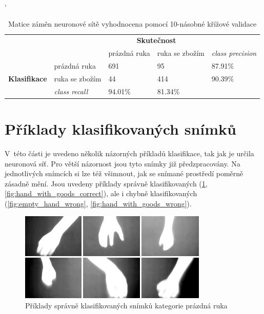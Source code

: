 \begin{table}[]
  \catcode`
  \centering
  \begin{tabular}{cl|l|l|l}
    \cline{3-4}
    \multicolumn{1}{l}{} & \multicolumn{1}{c|}{} & \multicolumn{2}{c|}{\cellcolor{Blue}\color{White}\textbf{Skutečnost}} &  \\ \cline{3-5} 
     & \multicolumn{1}{c|}{} & prázdná ruka & ruka se zbožím & \multicolumn{1}{l|}{\textit{class precision}} \\ \hline
    \multicolumn{1}{|c|}{\cellcolor{Blue}} & prázdná ruka & 691 & 95 & \multicolumn{1}{l|}{87.91\%} \\ \cline{2-5} 
    \multicolumn{1}{|c|}{\multirow{-2}{*}{\cellcolor{Blue}\color{White}\textbf{Klasifikace}}} & ruka se zbožím & 44 & 414 & \multicolumn{1}{l|}{90.39\%} \\ \hline
    \multicolumn{1}{l|}{\textit{}} & \textit{class recall} & 94.01\% & 81.34\% &  \\ \cline{2-4}
  \end{tabular}
  \caption{Matice záměn neuronové sítě vyhodnocena pomocí 10-násobné křížové validace}
  \label{table:neural_net_result}
\end{table}

\section{Příklady klasifikovaných snímků}
V~této části je uvedeno několik názorných příkladů klasifikace, tak jak je určila neuronová síť. Pro větší názornost jsou tyto snímky již předzpracovány. Na jednotlivých snímcích si lze též všimnout, jak se snímané prostředí poměrně zásadně mění. Jsou uvedeny příklady správně klasifikovaných (\ref{fig:empty_hand_correct}, \ref{fig:hand_with_goods_correct}), ale i chybně klasifikovaných (\ref{fig:empty_hand_wrong}, \ref{fig:hand_with_goods_wrong}). 

\begin{figure}[h]
  \centering
  \includegraphics[width=0.8\textwidth]{images/empty_hand_correct.png}
  \caption{Příklady správně klasifikovaných snímků kategorie prázdná ruka}
  \label{fig:empty_hand_correct}
\end{figure} 


